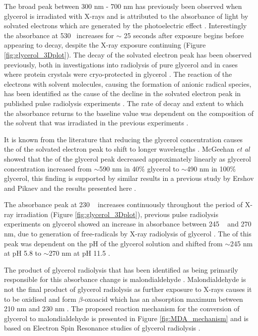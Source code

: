 The broad peak between 300 nm - 700 nm has previously been observed when glycerol is irradiated with X-rays and is attributed to the absorbance of light by solvated electrons which are generated by the photoelectric effect \cite{McGeehan2009,Owen2011}. Interestingly the absorbance at 530 \nm ~increases for $\sim$ 25 seconds after exposure begins before appearing to decay, despite the X-ray exposure continuing (Figure \ref{fig:glycerol_3Dplot}). The decay of the solvated electron peak has been observed previously, both in investigations into radiolysis of pure glycerol and in cases where protein crystals were cryo-protected in glycerol \cite{Kajiwara1972,Owen2011}. The reaction of the electrons with solvent molecules, causing the formation of anionic radical species, has been identified as the cause of the decline in the solvated electron peak in published pulse radiolysis experiments \cite{LeCaer2016}. The rate of decay and extent to which the absorbance returns to the baseline value was dependent on the composition of the solvent that was irradiated in the previous experiments \cite{LeCaer2016}. %

It is known from the literature that reducing the glycerol concentration causes the \lwl of the solvated electron peak to shift to longer wavelengths \cite{Ershov1968,McGeehan2009}. McGeehan \textit{et al} showed that the \lwl of the glycerol peak decreased approximately linearly as glycerol concentration increased from $\sim$590 nm in 40\% glycerol to $\sim$490 nm in 100\% glycerol, this finding is supported by similar results in a previous study by Ershov and Pikaev and the results presented here \cite{McGeehan2009,Ershov1968}.        

The absorbance peak at 230 \nm~ increases continuously throughout the period of X-ray irradiation (Figure \ref{fig:glycerol_3Dplot}), previous pulse radiolysis experiments on glycerol showed an increase in absorbance between 245 \nm~ and 270 nm, due to generation of free-radicals by X-ray radiolysis of glycerol \cite{Moore1976}. The \lwl of this peak was dependent on the pH of the glycerol solution and shifted from $\sim$245 nm at pH 5.8 to $\sim$270 nm at pH 11.5 \cite{Moore1976}. 

The product of glycerol radiolysis that has been identified as being primarily responsible for this absorbance change is malondialdehyde \cite{Moore1976,Owen2011,Ivanova2009}. Malondialdehyde is not the final product of glycerol radiolysis as further exposure to X-rays causes it to be oxidised and form $\beta$-oxoacid which has an absorption maximum between 210 \si{\nano\meter} and 230 \si{\nano\meter} \cite{Ivanova2009}. The proposed reaction mechanism for the conversion of glycerol to malondialdehyde is presented in Figure \ref{fig:MDA_mechanism} and is based on Electron Spin Resonance studies of glycerol radiolysis \cite{Ivanova2009,Kuwabara1983,Steenken1974}. 
\FloatBarrier

